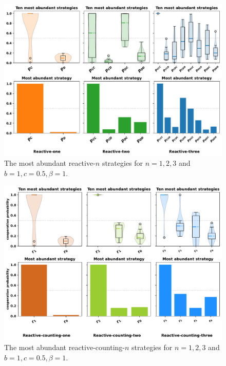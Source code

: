 \documentclass{article}
\theoremstyle{definition}
\begin{document}
\begin{figure}[!htbp]
  \includegraphics[width=\textwidth]{figures/abundant_strategies.pdf}
  \caption{The most abundant reactive-$n$ strategies for $n=1,2,3$ and $b=1, c=0.5, \beta=1$.}
\end{figure}

\begin{figure}[!htbp]
  \includegraphics[width=\textwidth]{figures/abundant_strategies_counting.pdf}
  \caption{The most abundant reactive-counting-$n$ strategies for $n=1,2,3$ and $b=1, c=0.5, \beta=1$.}
\end{figure}


~\\

\end{document}
